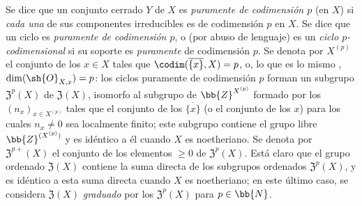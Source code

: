 \begin{env}[21.6.2]
\label{IV.21.6.2}
Se dice que un conjunto cerrado $Y$ de $X$ es \emph{puramente de codimensión $p$} (en $X$) si \emph{cada una} de sus componentes irreducibles es de codimensión $p$ en $X$.
Se dice que un ciclo es \emph{puramente de codimensión $p$}, o (por abuso de lenguaje) es un \emph{ciclo $p$-codimensional} si su soporte es \emph{puramente} de codimensión $p$.
Se denota por $X^{(p)}$ el conjunto de los $x\in X$ tales que $\codim(\overline{\{x\}},X)=p$, o, lo que es lo mismo , $\dim(\sh{O}_{X,x})=p$:
los ciclos puramente de codimensión $p$ forman un subgrupo $\mathfrak{Z}^p(X)$ de $\mathfrak{Z}(X)$, isomorfo al subgrupo de $\bb{Z}^{X^{(p)}}$ formado por los $(n_x)_{x\in X^{(p)}}$ tales que el conjunto de los $\overline{\{x\}}$ (o el conjunto de los $x$) para los cuales $n_x\neq0$ sea localmente finito;
este subgrupo contiene el grupo libre $\bb{Z}^{(X^{(p)})}$ y es idéntico a él cuando $X$ es noetheriano.
Se denota por $\mathfrak{Z}^{p+}(X)$ el conjunto de los elementos $\geq0$ de $\mathfrak{Z}^p(X)$.
Está claro que el grupo ordenado $\mathfrak{Z}(X)$ contiene la suma directa de los subgrupos ordenados $\mathfrak{Z}^p(X)$, y es idéntico a esta suma directa cuando $X$ es noetheriano;
en este último caso, se considera $\mathfrak{Z}(X)$ \emph{graduado} por los $\mathfrak{Z}^p(X)$ para $p\in\bb{N}$.
\end{env}

